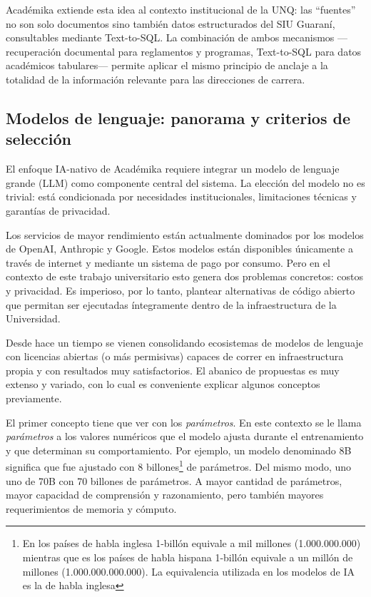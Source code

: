 \documentclass[
  spanish,
]{article}
\begin{document}
Académika extiende esta idea al contexto institucional de la UNQ: las
``fuentes'' no son solo documentos sino también datos estructurados del
SIU Guaraní, consultables mediante Text-to-SQL. La combinación de
ambos mecanismos ---recuperación documental para reglamentos y programas,
Text-to-SQL para datos académicos tabulares--- permite aplicar el
mismo principio de anclaje a la totalidad de la información relevante
para las direcciones de carrera.

\subsection{Modelos de lenguaje: panorama y criterios de selección}\label{modelos-de-lenguaje}

El enfoque IA-nativo de Académika requiere integrar un modelo de lenguaje grande (LLM)
como componente central del sistema.
La elección del modelo no es trivial: está condicionada por necesidades institucionales,
limitaciones técnicas y garantías de privacidad.

Los servicios de mayor rendimiento están actualmente dominados por los modelos de OpenAI, Anthropic y Google.
Estos modelos están disponibles únicamente a través de internet y mediante un sistema de pago por consumo.
Pero en el contexto de este trabajo universitario esto genera dos problemas concretos: costos y privacidad.
Es imperioso, por lo tanto, plantear alternativas de código abierto
que permitan ser ejecutadas íntegramente dentro de la infraestructura de la Universidad.

Desde hace un tiempo se vienen consolidando ecosistemas de modelos de lenguaje con
licencias abiertas (o más permisivas) capaces de correr en infraestructura propia
y con resultados muy satisfactorios. El abanico de propuestas es muy extenso y variado,
con lo cual es conveniente explicar algunos conceptos previamente.

El primer concepto tiene que ver con los \emph{parámetros}.
En este contexto se le llama \emph{parámetros} a los valores numéricos que el modelo
ajusta durante el entrenamiento y que determinan su comportamiento.
Por ejemplo, un modelo denominado 8B significa que fue ajustado con
8 billones\footnote{En los países de habla inglesa
1-billón equivale a mil millones (1.000.000.000) mientras que es los países de habla hispana 1-billón
equivale a un millón de millones (1.000.000.000.000). La equivalencia utilizada
en los modelos de IA es la de habla inglesa} de parámetros.
Del mismo modo, uno uno de 70B con 70 billones de parámetros.
A mayor cantidad de parámetros, mayor capacidad de comprensión y razonamiento,
pero también mayores requerimientos de memoria y cómputo.
\end{document}
